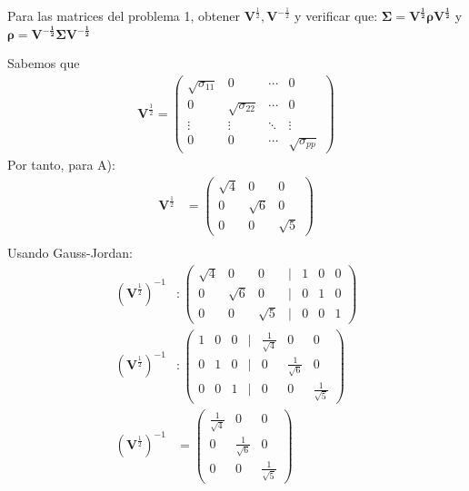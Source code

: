 \begin{problem}{2}
Para las matrices del problema 1, obtener $\mathbf{V}^{\frac{1}{2}},\mathbf{V}^{-\frac{1}{2}} $ y verificar que: $\mathbf{\Sigma}=\mathbf{V^{\frac{1}{2}} \rho V^{\frac{1}{2}}}$ y $\mathbf{\rho}=\mathbf{V^{-\frac{1}{2}} \Sigma V^{-\frac{1}{2}}}$
\end{problem}

\begin{sol}
Sabemos que
\begin{align*}
\mathbf{V}^{\frac{1}{2}}=
\begin{pmatrix}
\sqrt{\sigma_{11}} & 0 & \cdots & 0 \\
0 & \sqrt{\sigma_{22}} & \cdots & 0 \\
\vdots & \vdots & \ddots & \vdots \\
0 & 0 & \cdots & \sqrt{\sigma_{pp}}
\end{pmatrix}
\end{align*}
Por tanto, para A):
\begin{align*}
\mathbf{V}^{\frac{1}{2}} &=
\begin{pmatrix}
\sqrt{4} & 0 & 0 \\
0 & \sqrt{6} & 0 \\
0 & 0 & \sqrt{5}
\end{pmatrix}\\
\end{align*}
Usando Gauss-Jordan:
\begin{align*}
(\mathbf{V}^{\frac{1}{2}})^{-1} &:
\begin{pmatrix}
\sqrt{4} & 0 & 0 & \vert &1 & 0 & 0 \\
0 & \sqrt{6} & 0 & \vert &0 & 1 & 0 \\
0 & 0 & \sqrt{5} & \vert & 0 & 0 & 1 
\end{pmatrix}\\
(\mathbf{V}^{\frac{1}{2}})^{-1} &:
\begin{pmatrix}
1 & 0 & 0 & \vert &\frac{1}{\sqrt{4}} & 0 & 0 \\
0 & 1 & 0 & \vert &0 &\frac{1}{\sqrt{6}} & 0 \\
0 & 0 & 1 & \vert & 0 & 0 & \frac{1}{\sqrt{5}}
\end{pmatrix}\\
(\mathbf{V}^{\frac{1}{2}})^{-1} &= 
\begin{pmatrix}
\frac{1}{\sqrt{4}} & 0 & 0 \\
0 &\frac{1}{\sqrt{6}} & 0 \\
 0 & 0 & \frac{1}{\sqrt{5}}
\end{pmatrix}\\

\end{align*}
\end{sol}
